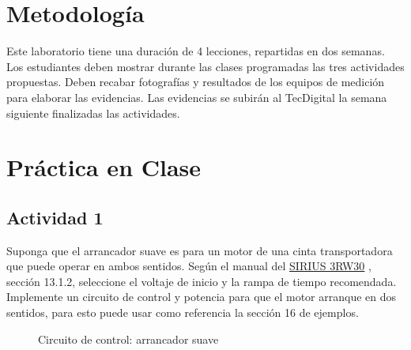 \section{Metodología}

Este laboratorio tiene una duración de 4 lecciones, repartidas en dos semanas. Los estudiantes deben mostrar durante las clases programadas las tres actividades propuestas. Deben recabar fotografías y resultados de los equipos de medición para elaborar las evidencias. Las evidencias se subirán al TecDigital la semana siguiente finalizadas las actividades.

\section{Práctica en Clase}

\subsection{Actividad 1}

Suponga que el arrancador suave es para un motor de una cinta transportadora que puede operar en ambos sentidos. Según el manual del \href{https://support.industry.siemens.com/dl/files/095/38752095/att_1310813/v1/Manual_softstarter_3RW30_3RW40_es-MX.pdf}{SIRIUS 3RW30} \cite{SIEMENS}, sección 13.1.2, seleccione el voltaje de inicio y la rampa de tiempo recomendada.
Implemente un circuito de control y potencia para que el motor arranque en dos sentidos, para esto puede usar como referencia la sección 16 de ejemplos. 

 \begin{figure}[H]
    \centering
		\caption{Circuito de control: arrancador suave}
 \end{figure}

